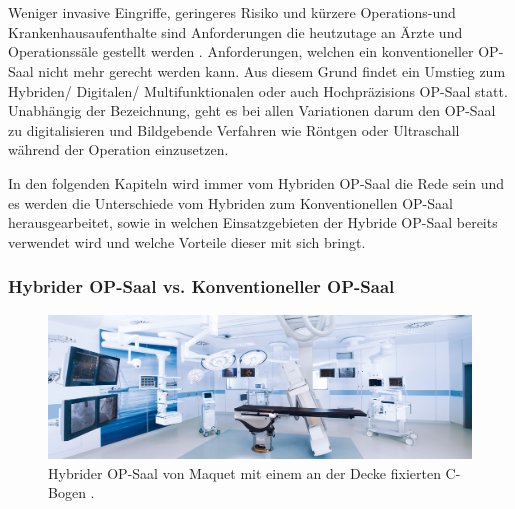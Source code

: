 \chapter{}
\label{sec:overview}

Weniger invasive Eingriffe, geringeres Risiko und kürzere Operations-und Krankenhausaufenthalte sind Anforderungen die heutzutage an Ärzte und Operationssäle gestellt werden \cite{DerDigitaleOperationssaal}. Anforderungen, welchen ein konventioneller OP-Saal nicht mehr gerecht werden kann. Aus diesem Grund findet ein Umstieg zum Hybriden/ Digitalen/ Multifunktionalen oder auch Hochpräzisions OP-Saal statt. Unabhängig der Bezeichnung, geht es bei allen Variationen darum den OP-Saal zu digitalisieren und Bildgebende Verfahren wie Röntgen oder Ultraschall während der Operation einzusetzen.

In den folgenden Kapiteln wird immer vom Hybriden OP-Saal die Rede sein und es werden die Unterschiede vom Hybriden zum Konventionellen OP-Saal herausgearbeitet, sowie in welchen Einsatzgebieten der Hybride OP-Saal bereits verwendet wird und welche Vorteile dieser mit sich bringt.

\subsection{Hybrider OP-Saal vs. Konventioneller OP-Saal} 

\begin{figure} [H]
	\includegraphics[scale = .3]{Content/Pictures/hybrid-or.png}
	\caption{Hybrider OP-Saal von Maquet mit einem an der Decke fixierten C-Bogen \cite{Maquet}.}
	\label{fig:hybridor}
\end{figure}


